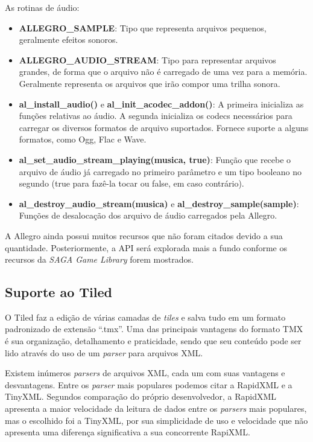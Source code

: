 % 
As rotinas de áudio:
%
\begin{itemize}
 \item \textbf{ALLEGRO\_SAMPLE}: Tipo que representa arquivos pequenos, geralmente efeitos sonoros.
 \item \textbf{ALLEGRO\_AUDIO\_STREAM}: Tipo para representar arquivos grandes, de forma que o arquivo não é carregado de uma vez para a 
 memória. Geralmente representa os arquivos que irão compor uma trilha sonora.
 \item \textbf{al\_install\_audio()} e \textbf{al\_init\_acodec\_addon()}: A primeira inicializa as funções relativas ao áudio. A segunda inicializa os 
 codecs necessários para carregar os diversos formatos de arquivo suportados. Fornece suporte a alguns formatos, como Ogg, Flac e Wave.
 \item \textbf{al\_set\_audio\_stream\_playing(musica, true)}: Função que recebe o arquivo de áudio já carregado no primeiro parâmetro e um tipo 
 booleano no segundo (true para fazê-la tocar ou false, em caso contrário).
 \item \textbf{al\_destroy\_audio\_stream(musica) } e \textbf{al\_destroy\_sample(sample)}: Funções de desalocação dos arquivo de áudio carregados 
 pela Allegro.
\end{itemize}
%
%
A Allegro ainda possui muitos recursos que não foram citados devido a sua quantidade. Posteriormente, a API será explorada mais a fundo conforme os recursos da \textit{SAGA Game Library} forem mostrados.
%
%
\subsection{Suporte ao Tiled}
%
O Tiled faz a edição de várias camadas de \textit{tiles} e salva tudo em um formato padronizado de extensão ``.tmx''. Uma das principais vantagens do formato TMX é sua organização, detalhamento e praticidade, sendo que seu conteúdo pode ser lido através do uso de um \textit{parser} para arquivos XML.
\par 
Existem inúmeros \textit{parsers} de arquivos XML, cada um com suas vantagens e desvantagens. Entre os \textit{parser} mais populares podemos citar a RapidXML e a TinyXML. Segundos comparação do próprio desenvolvedor, a RapidXML apresenta a maior velocidade da leitura de dados entre os \textit{parsers} mais populares, mas o escolhido foi a TinyXML, por sua simplicidade de uso e velocidade que não apresenta uma diferença significativa a sua concorrente RapiXML. 
%
%
